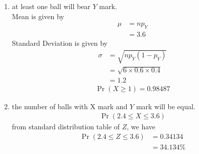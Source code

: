 \documentclass[journal,12pt,onecolumn]{IEEEtran}
\theoremstyle{remark}
\begin{document}
\begin{enumerate}
\item at least one ball will bear $Y$ mark.\\
Mean is given by
\begin{align}
	\mu &= np_Y \\
	&= 3.6
\end{align}
Standard Deviation is given by
\begin{align}
	\sigma &= \sqrt{np_Y(1 - p_Y)}\\
	&= \sqrt{6 \times 0.6 \times 0.4}\\
	&=  1.2
\end{align}
\begin{align}
	\Pr(X \geq 1) = 0.98487
\end{align}

\item the number of balls with X mark and $Y$ mark will be equal.\\
\begin{align}
\Pr(2.4 \leq X\leq 3.6)	
\end{align}
from standard distribution table of $Z$, we have
\begin{align}
	\Pr(2.4 \leq Z\leq 3.6) &= 0.34134\\
	&= 34.134\%
\end{align}
\end{enumerate}
\end{document}
